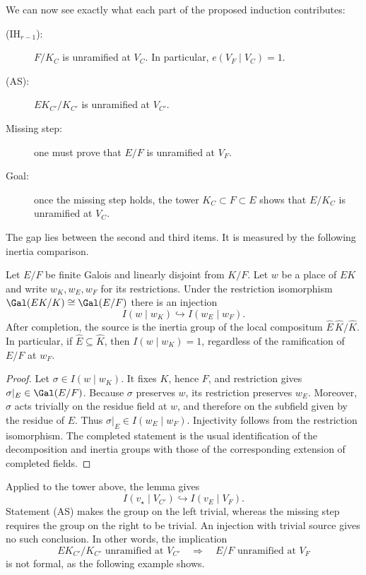 We can now see exactly what each part of the proposed induction contributes:
\begin{description}
  \item[\textnormal{(IH$_{r-1}$):}]
    $F/K_C$ is unramified at $V_C$. In particular,
    $e(V_F\mid V_C)=1$.
  \item[\textnormal{(AS):}]
    $EK_{C'}/K_{C'}$ is unramified at $V_{C'}$.
  \item[Missing step:]
    one must prove that $E/F$ is unramified at $V_F$.
  \item[Goal:]
    once the missing step holds, the tower
    $K_C\subset F\subset E$ shows that $E/K_C$ is unramified at $V_C$.
\end{description}

The gap lies between the second and third items. It is measured by the
following inertia comparison.

\begin{lemma}\label{lem:inertia-injection}
Let $E/F$ be finite Galois and linearly disjoint from $K/F$. Let $w$ be a
place of $EK$ and write $w_K,w_E,w_F$ for its restrictions. Under the
restriction isomorphism $\Gal(EK/K)\cong\Gal(E/F)$ there is an injection
\[
I(w\mid w_K)\hookrightarrow I(w_E\mid w_F).
\]
After completion, the source is the inertia group of the local compositum
$\widehat E\,\widehat K/\widehat K$. In particular, if
$\widehat E\subseteq\widehat K$, then $I(w\mid w_K)=1$, regardless of the
ramification of $E/F$ at $w_F$.
\end{lemma}

\begin{proof}
Let $\sigma\in I(w\mid w_K)$. It fixes $K$, hence $F$, and restriction gives
$\sigma|_E\in\Gal(E/F)$. Because $\sigma$ preserves $w$, its restriction
preserves $w_E$. Moreover, $\sigma$ acts trivially on the residue field at
$w$, and therefore on the subfield given by the residue of $E$. Thus
$\sigma|_E\in I(w_E\mid w_F)$. Injectivity follows from the restriction
isomorphism. The completed statement is the usual identification of the
decomposition and inertia groups with those of the corresponding extension
of completed fields.
\end{proof}

Applied to the tower above, the lemma gives
\[
I(v_\star\mid V_{C'})\hookrightarrow I(v_E\mid V_F).
\]
Statement (AS) makes the group on the left trivial, whereas the missing step
requires the group on the right to be trivial. An injection with trivial
source gives no such conclusion. In other words, the implication
\[
EK_{C'}/K_{C'}\text{ unramified at }V_{C'}
\quad\Longrightarrow\quad
E/F\text{ unramified at }V_F
\]
is not formal, as the following example shows.

